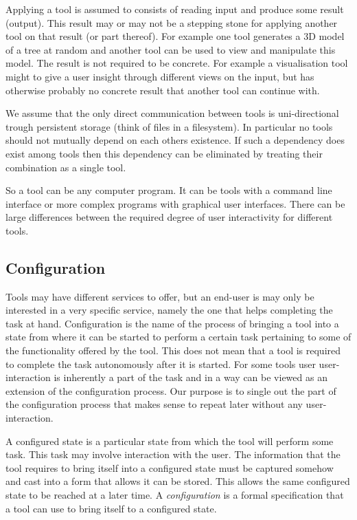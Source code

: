 \documentclass{article}
\begin{document}
   Applying a tool is assumed to consists of reading input and produce some
   result (output).  This result may or may not be a stepping stone for
   applying another tool on that result (or part thereof).  For example one
   tool generates a 3D model of a tree at random and another tool can be used
   to view and manipulate this model. The result is not required to be
   concrete. For example a visualisation tool might to give a user insight
   through different views on the input, but has otherwise probably no concrete
   result that another tool can continue with.
   
   We assume that the only direct communication between tools is
   uni-directional trough persistent storage (think of files in a filesystem).
   In particular no tools should not mutually depend on each others existence.
   If such a dependency does exist among tools then this dependency can be
   eliminated by treating their combination as a single tool.

   So a tool can be any computer program. It can be tools with a command line
   interface or more complex programs with graphical user interfaces.  There
   can be large differences between the required degree of user interactivity
   for different tools.

  \subsection{Configuration}

   Tools may have different services to offer, but an end-user is may only be
   interested in a very specific service, namely the one that helps completing
   the task at hand. Configuration is the name of the process of bringing a
   tool into a state from where it can be started to perform a certain task
   pertaining to some of the functionality offered by the tool. This does not
   mean that a tool is required to complete the task autonomously after it is
   started. For some tools user user-interaction is inherently a part of the
   task and in a way can be viewed as an extension of the configuration
   process. Our purpose is to single out the part of the configuration process
   that makes sense to repeat later without any user-interaction.
   
   A configured state is a particular state from which the tool will perform
   some task. This task may involve interaction with the user. The information
   that the tool requires to bring itself into a configured state must be
   captured somehow and cast into a form that allows it can be stored. This
   allows the same configured state to be reached at a later time. A
   \textit{configuration} is a formal specification that a tool can use to
   bring itself to a configured state.
\end{document}
